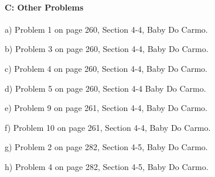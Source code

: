\documentclass[12pt]{article}
\begin{document}
\paragraph{C: Other Problems}
\begin{itemize}

{\item a) Problem 1 on page 260, Section 4-4, Baby Do Carmo.}
{\item b) Problem 3 on page 260, Section 4-4, Baby Do Carmo.}
{\item c) Problem 4 on page 260, Section 4-4, Baby Do Carmo.}
{\item d) Problem 5 on page 260,  Section 4-4 Baby Do Carmo.}
{\item e) Problem 9 on page 261,  Section 4-4, Baby Do Carmo.}
{\item f) Problem 10 on page 261,  Section 4-4, Baby Do Carmo.}
{\item g) Problem 2 on page 282,  Section 4-5, Baby Do Carmo.}
{\item h) Problem 4 on page 282,  Section 4-5, Baby Do Carmo.}
\end{itemize}


\end{document}
